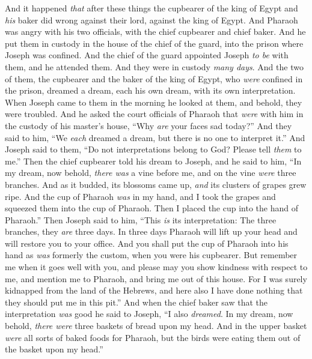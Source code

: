 \begin{biblechapter} %
 And it happened \textit{that} after these things the cupbearer of the king of Egypt and \textit{his} baker did wrong against their lord, against the king of Egypt.
\verse And Pharaoh was angry with his two officials, with the chief cupbearer and chief baker.
\verse And he put them in custody in the house of the chief of the guard, into the prison where Joseph was confined.
\verse And the chief of the guard appointed Joseph \textit{to be} with them, and he attended them. And they were in custody \textit{many days}.
\verse And the two of them, the cupbearer and the baker of the king of Egypt, who \textit{were} confined in the prison, dreamed a dream, each his own dream, with its own interpretation.
\verse When Joseph came to them in the morning he looked at them, and behold, they were troubled.
\verse And he asked the court officials of Pharaoh that \textit{were} with him in the custody of his master’s house, “Why \textit{are} your faces sad today?”
\verse And they said to him, “We \textit{each} dreamed a dream, but there is no one to interpret it.” And Joseph said to them, “Do not interpretations belong to God? Please tell \textit{them} to me.”
\verse Then the chief cupbearer told his dream to Joseph, and he said to him, “In my dream, now behold, \textit{there was} a vine before me,
\verse and on the vine \textit{were} three branches. And as it budded, its blossoms came up, \textit{and} its clusters of grapes grew ripe.
\verse And the cup of Pharaoh \textit{was} in my hand, and I took the grapes and squeezed them into the cup of Pharaoh. Then I placed the cup into the hand of Pharaoh.”
\verse Then Joseph said to him, “This \textit{is} its interpretation: The three branches, they \textit{are} three days.
\verse In three days Pharaoh will lift up your head and will restore you to your office. And you shall put the cup of Pharaoh into his hand as \textit{was} formerly the custom, when you were his cupbearer.
\verse But remember me when it goes well with you, and please may you show kindness with respect to me, and mention me to Pharaoh, and bring me out of this house.
\verse For I was surely kidnapped from the land of the Hebrews, and here also I have done nothing that they should put me in this pit.”
\verse And when the chief baker saw that the interpretation \textit{was} good he said to Joseph, “I also \textit{dreamed}. In my dream, now behold, \textit{there were} three baskets of bread upon my head.
\verse And in the upper basket \textit{were} all sorts of baked foods for Pharaoh, but the birds were eating them out of the basket upon my head.”

\end{biblechapter}
